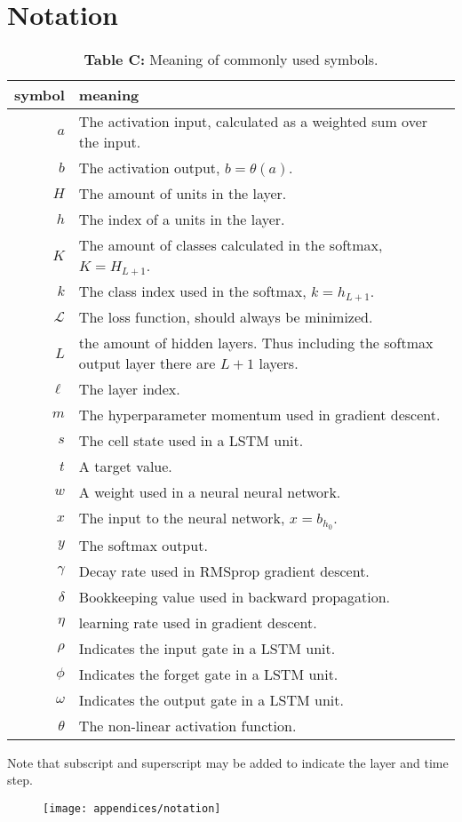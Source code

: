 \chapter{Notation}

\begin{table}[H]
\centering
\begin{tabular}{r p{10cm}}
	symbol & meaning \\ \hline
	$a$ & The activation input, calculated as a weighted sum over the input. \\
	$b$ & The activation output, $b = \theta(a)$. \\
	$H$ & The amount of units in the layer.\\
	$h$ & The index of a units in the layer. \\
	$K$ & The amount of classes calculated in the softmax, $K = H_{L+1}$. \\ 
	$k$ & The class index used in the softmax, $k = h_{L + 1}$.  \\
	$\mathcal{L}$ & The loss function, should always be minimized. \\
	$L$ & the amount of hidden layers. Thus including the softmax output layer there are $L+1$ layers. \\
	$\ell$ & The layer index. \\
	$m$ & The hyperparameter momentum used in gradient descent. \\
	$s$ & The cell state used in a LSTM unit. \\
	$t$ & A target value. \\
	$w$ & A weight used in a neural neural network. \\
	$x$ & The input to the neural network, $x = b_{h_0}$. \\
	$y$ & The softmax output. \\
	$\gamma$ & Decay rate used in RMSprop gradient descent. \\
	$\delta$ & Bookkeeping value used in backward propagation. \\
	$\eta$ & learning rate used in gradient descent. \\
	$\rho$ & Indicates the input gate in a LSTM unit. \\ 
	$\phi$ & Indicates the forget gate in a LSTM unit. \\ 
	$\omega$ & Indicates the output gate in a LSTM unit. \\ 
	$\theta$ & The non-linear activation function.
\end{tabular}
\caption*{\textbf{Table C:} Meaning of commonly used symbols.}
\end{table}

\vspace{-0.1cm}
Note that subscript and superscript may be added to indicate the layer and time step.
\begin{figure}[H]
	\vspace{-0.2cm}
	\centering
	\texttt{[image: appendices/notation]}
\end{figure}
